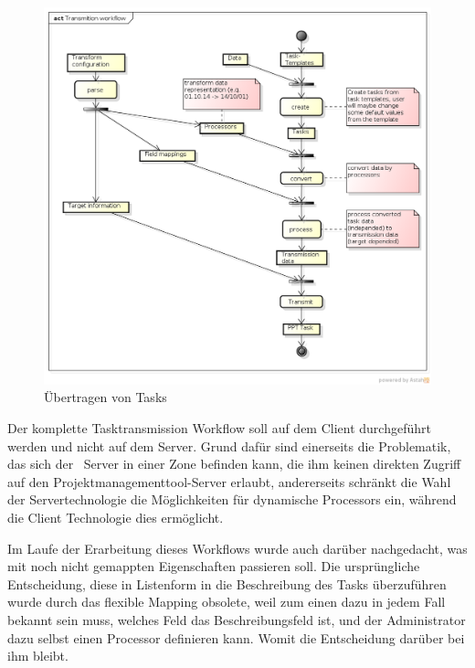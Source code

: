 			\begin{figure}[H]
				\includegraphics[width=\textwidth]{architecture/media/img/transmissionWorkflow.png}
				\centering
				\caption{Übertragen von Tasks}
				\label{fig:transmissionWorkflow}
			\end{figure}
			
			Der komplette Tasktransmission Workflow soll auf dem Client durchgeführt werden und nicht auf dem Server. Grund dafür sind einerseits die Problematik, 
			das sich der \eeppi\ Server in einer Zone befinden kann, 
			die ihm keinen direkten Zugriff auf den Projektmanagementtool-Server erlaubt,
			andererseits schränkt die Wahl der Servertechnologie die Möglichkeiten für dynamische Processors ein, während die Client Technologie dies ermöglicht.
			
			Im Laufe der Erarbeitung dieses Workflows wurde auch darüber nachgedacht, 
			was mit noch nicht gemappten Eigenschaften passieren soll. 
			Die ursprüngliche Entscheidung, diese in Listenform in die Beschreibung des Tasks
			überzuführen wurde durch das flexible Mapping obsolete, 
			weil zum einen dazu in jedem Fall bekannt sein muss, welches Feld das Beschreibungsfeld ist,
			und der Administrator dazu selbst einen Processor definieren kann.
			Womit die Entscheidung darüber bei ihm bleibt.
		
		
